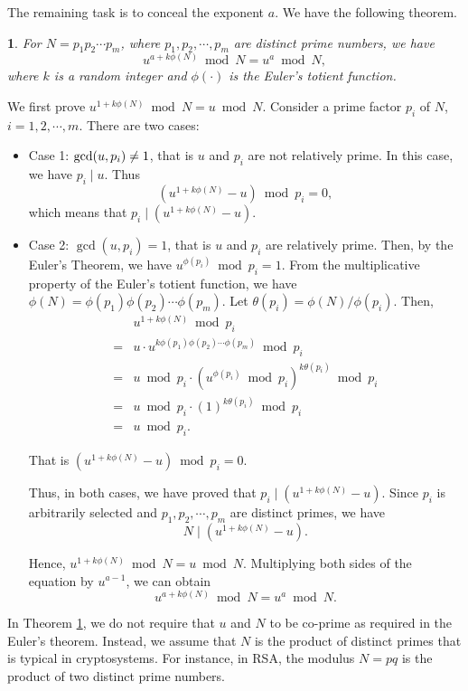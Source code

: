 \documentclass[english,draftcls,onecolumn,11pt]{IEEEtran}
\theoremstyle{definition}
\theoremstyle{plain}
\newtheorem{thm}{\protect\theoremname}
\theoremstyle{plain}
\theoremstyle{definition}
\providecommand{\theoremname}{Theorem}
\begin{document}
The remaining task is to conceal the exponent $a$. We have the following
theorem.
\begin{thm}
\label{thm:euler} For $N=p_{1}p_{2}\cdots p_{m}$, where $p_{1},p_{2},\cdots,p_{m}$
are distinct prime numbers, we have
\[
u^{a+k\phi(N)}\bmod N=u^{a}\bmod N,
\]
where $k$ is a random integer and $\phi(\cdot)$ is the Euler's totient
function.\end{thm}
\begin{IEEEproof}
We first prove $u^{1+k\phi(N)}\bmod N=u\bmod N$. Consider a prime
factor $p_{i}$ of $N$, $i=1,2,\cdots,m$. There are two cases:
\begin{itemize}
\item Case 1: $\mbox{\ensuremath{\gcd}}(u,p_{i})\neq1$, that is $u$ and
$p_{i}$ are not relatively prime. In this case, we have $p_{i}\mid u$.
Thus
\[
(u^{1+k\phi(N)}-u)\bmod p_{i}=0,
\]
which means that $p_{i}\mid(u^{1+k\phi(N)}-u)$.
\item Case 2: $\gcd(u,p_{i})=1$, that is $u$ and $p_{i}$ are relatively
prime. Then, by the Euler's Theorem, we have $u^{\phi(p_{i})}\bmod p_{i}=1$.
From the multiplicative property of the Euler's totient function,
we have $\phi(N)=\phi(p_{1})\phi(p_{2})\cdots\phi(p_{m})$. Let $\theta(p_{i})=\phi(N)/\phi(p_{i})$.
Then,
\[
\begin{array}{ll}
 & u^{1+k\phi(N)}\bmod p_{i}\\
= & u\cdot u^{k\phi(p_{1})\phi(p_{2})\cdots\phi(p_{m})}\bmod p_{i}\\
= & u\bmod p_{i}\cdot(u^{\phi(p_{i})}\bmod p_{i})^{k\theta(p_{i})}\bmod p_{i}\\
= & u\bmod p_{i}\cdot(1)^{k\theta(p_{i})}\bmod p_{i}\\
= & u\bmod p_{i}.
\end{array}
\]



That is $(u^{1+k\phi(N)}-u)\bmod p_{i}=0$. 


Thus, in both cases, we have proved that $p_{i}\mid(u^{1+k\phi(N)}-u).$
Since $p_{i}$ is arbitrarily selected and $p_{1},p_{2},\cdots,p_{m}$
are distinct primes, we have
\[
N\mid(u^{1+k\phi(N)}-u).
\]



Hence, $u^{1+k\phi(N)}\bmod N=u\bmod N$. Multiplying both sides of
the equation by $u^{a-1}$, we can obtain
\[
u^{a+k\phi(N)}\bmod N=u^{a}\bmod N.
\]


\end{itemize}
\end{IEEEproof}
In Theorem \ref{thm:euler}, we do not require that $u$ and $N$
to be co-prime as required in the Euler's theorem. Instead, we assume
that $N$ is the product of distinct primes that is typical in cryptosystems.
For instance, in RSA, the modulus $N=pq$ is the product of two distinct
prime numbers.
\end{document}
